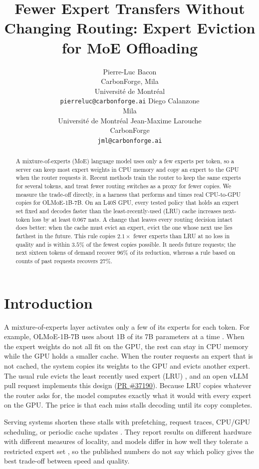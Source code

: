 \documentclass{article}
\title{Fewer Expert Transfers Without Changing Routing: Expert Eviction for
  MoE Offloading}
\author{%
  Pierre-Luc Bacon\\
  CarbonForge, Mila\\
  Universit\'e de Montr\'eal\\
  \texttt{pierreluc@carbonforge.ai}
  \And
  Diego Calanzone\\
  Mila\\
  Universit\'e de Montr\'eal
  \And
  Jean-Maxime Larouche\\
  CarbonForge\\
  \texttt{jml@carbonforge.ai}
}
\begin{document}
\maketitle

\begin{abstract}
A mixture-of-experts (MoE) language model uses only a few experts per token,
so a server can keep most expert weights in CPU memory and copy an expert to
the GPU when the router requests it. Recent methods train the router to keep
the same experts for several tokens, and treat fewer routing switches as a
proxy for fewer copies. We measure the trade-off directly, in a harness that
performs and times real CPU-to-GPU copies for OLMoE-1B-7B. On an L40S GPU,
every tested policy that holds an expert set fixed and decodes faster than the
least-recently-used (LRU) cache increases next-token loss by at least $0.067$
nats. A change that leaves every routing decision intact does better: when the
cache must evict an expert, evict the one whose next use lies farthest in the
future. This rule copies $2.1\times$ fewer experts than LRU at no loss in
quality and is within $3.5\%$ of the fewest copies possible. It needs future
requests; the next sixteen tokens of demand recover $96\%$ of its reduction,
whereas a rule based on counts of past requests recovers $27\%$.
\end{abstract}

\section{Introduction}
\label{sec:intro}

A mixture-of-experts layer activates only a few of its experts for each
token. For example, OLMoE-1B-7B uses about 1B of its 7B parameters at a time
\citep{muennighoff2024olmoe}. When the expert weights do not all fit on the
GPU, the rest can stay in CPU memory while the GPU holds a smaller cache. When
the router requests an expert that is not cached, the system copies its
weights to the GPU and evicts another expert. The usual rule evicts the least
recently used expert (LRU) \citep{eliseev2023fast,adapmoe2024}, and an open
vLLM pull request implements this design
(\href{https://github.com/vllm-project/vllm/pull/37190}{PR \#37190}). Because
LRU copies whatever the router asks for, the model computes exactly what it
would with every expert on the GPU. The price is that each miss stalls
decoding until its copy completes.

Serving systems shorten these stalls with prefetching, request traces,
CPU/GPU scheduling, or periodic cache updates
\citep{eliseev2023fast,freetoken2026,xue2024moeinfinity,fmoe2025,fiddler2024,kong2024swapmoe}.
They report results on different hardware with different measures of
locality, and models differ in how well they tolerate a restricted expert set
\citep{liang2025local}, so the published numbers do not say which policy gives
the best trade-off between speed and quality.
\end{document}

